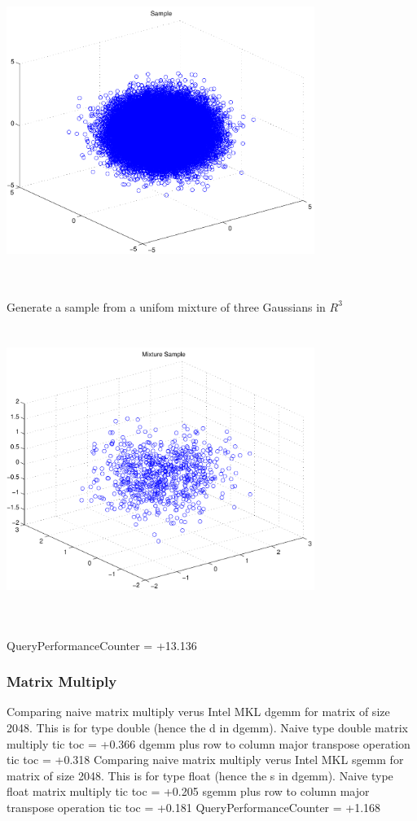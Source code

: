 \documentclass[9pt]{article}
\theoremstyle{plain}
\theoremstyle{definition}
\theoremstyle{remark}
\numberwithin{equation}{section}
\begin{document}
\includegraphics[width=10.0cm,height=10.0cm]{R_3_Normal.pdf}

Generate a sample from a unifom mixture of three Gaussians in $R^3$
\includegraphics[width=10.0cm,height=10.0cm]{R_3_Normal_Mixture.pdf}

QueryPerformanceCounter  =  +13.136
\subsubsection{Matrix Multiply}
Comparing naive matrix multiply verus Intel MKL dgemm for matrix of size 2048.
This is for type double (hence the d in dgemm).
Naive type double matrix multiply tic toc  =  +0.366
dgemm plus row to column major transpose operation tic toc  =  +0.318
Comparing naive matrix multiply verus Intel MKL sgemm for matrix of size 2048.
This is for type float (hence the s in dgemm).
Naive type float matrix multiply tic toc  =  +0.205
sgemm plus row to column major transpose operation tic toc  =  +0.181
QueryPerformanceCounter  =  +1.168
\end{document}
